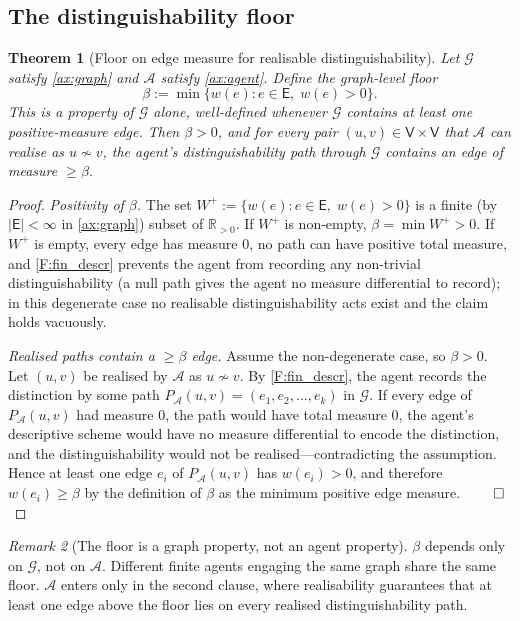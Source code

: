 \documentclass[11pt,twocolumn,a4paper]{article}
\theoremstyle{thmstyle}
\newtheorem{theorem}{Theorem}[section]
\theoremstyle{definition}
\theoremstyle{remark}
\newtheorem{remark}[theorem]{Remark}
\newcommand{\R}{\mathbb{R}}
\newcommand{\Graph}{\mathcal{G}}
\newcommand{\Vrt}{\mathsf{V}}
\newcommand{\Edg}{\mathsf{E}}
\newcommand{\Agent}{\mathcal{A}}
\newcommand{\floor}{\beta}
\begin{document}
\subsection{The distinguishability floor}

\begin{theorem}[Floor on edge measure for realisable
distinguishability]
\label{thm:floor}
Let $\Graph$ satisfy \cref{ax:graph} and $\Agent$ satisfy
\cref{ax:agent}. Define the graph-level floor
\[
  \floor := \min\{w(e) : e \in \Edg,\; w(e) > 0\}.
\]
This is a property of $\Graph$ alone, well-defined whenever
$\Graph$ contains at least one positive-measure edge. Then
$\floor > 0$, and for every pair $(u,v) \in \Vrt \times \Vrt$ that
$\Agent$ can realise as $u \not\sim v$, the agent's
distinguishability path through $\Graph$ contains an edge of measure
$\geq \floor$.
\end{theorem}

\begin{proof}
\emph{Positivity of $\floor$.} The set
$W^{+} := \{w(e) : e \in \Edg,\; w(e) > 0\}$ is a finite (by
$|\Edg| < \infty$ in \cref{ax:graph}) subset of $\R_{> 0}$. If
$W^{+}$ is non-empty, $\floor = \min W^{+} > 0$. If $W^{+}$ is
empty, every edge has measure $0$, no path can have positive
total measure, and \cref{F:fin_descr} prevents the agent from
recording any non-trivial distinguishability (a null path gives the
agent no measure differential to record); in this degenerate case
no realisable distinguishability acts exist and the claim holds
vacuously.

\emph{Realised paths contain a $\geq \floor$ edge.} Assume the
non-degenerate case, so $\floor > 0$. Let $(u,v)$ be realised by
$\Agent$ as $u \not\sim v$. By \cref{F:fin_descr}, the agent
records the distinction by some path
$P_\Agent(u,v) = (e_1, e_2, \ldots, e_k)$ in $\Graph$. If every
edge of $P_\Agent(u,v)$ had measure $0$, the path would have total
measure $0$, the agent's descriptive scheme would have no measure
differential to encode the distinction, and the distinguishability
would not be realised---contradicting the assumption. Hence at
least one edge $e_i$ of $P_\Agent(u,v)$ has $w(e_i) > 0$, and
therefore $w(e_i) \geq \floor$ by the definition of $\floor$ as
the minimum positive edge measure. $\qed$
\end{proof}

\begin{remark}[The floor is a graph property, not an agent
property]
\label{rem:floor_graph_property}
$\floor$ depends only on $\Graph$, not on $\Agent$. Different
finite agents engaging the same graph share the same floor.
$\Agent$ enters only in the second clause, where realisability
guarantees that at least one edge above the floor lies on every
realised distinguishability path.
\end{remark}
\end{document}
